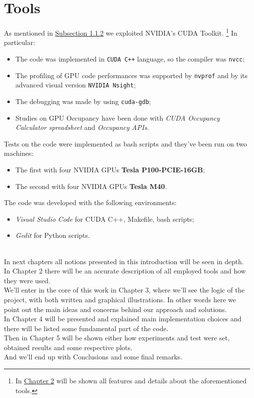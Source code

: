 \section{Tools}
\label{sect:tools}
	As mentioned in \hyperref[subs:otherApps]{Subsection 1.1.2} we exploited NVIDIA's CUDA Toolkit. 
	\footnote{In \hyperref[chap:tools]{Chapter 2} will be shown all features and details about the aforementioned tools.}	
	In particular:
	\begin{itemize}
		\item The code was implemented in \texttt{CUDA C++} language, so the compiler was \texttt{nvcc};	
			
		\item The profiling of GPU code performances was supported by \texttt{nvprof} and by its advanced visual version \texttt{NVIDIA Nsight};
				
		\item The debugging was made by using \texttt{cuda-gdb};
				
		\item Studies on GPU Occupancy have been done with \textit{CUDA Occupancy Calculator spreadsheet} and \textit{Occupancy APIs}.
	\end{itemize}
	Tests on the code were implemented as bash scripts and they've been run on two machines:	
	\begin{itemize}
		\item The first with four NVIDIA GPUs \textbf{Tesla P100-PCIE-16GB};
		
		\item The second with four NVIDIA GPUs \textbf{Tesla M40}.
	\end{itemize}
	The code was developed with the following environments:
	\begin{itemize}
		\item \textit{Visual Studio Code} for CUDA C++, Makefile, bash scripts;
		\item \textit{Gedit} for Python scripts.\\\\
	\end{itemize}
		
In next chapters all notions presented in this introduction will be seen in depth.\\
In Chapter 2 there will be an accurate description of all employed tools and how they were used.\\
We'll enter in the core of this work in Chapter 3, where we'll see the logic of the project, with both written and graphical illustrations. In other words here we point out the main ideas and concerns behind our approach and solutions.\\
In Chapter 4 will be presented and explained main implementation choices and there will be listed some fundamental part of the code.\\ 
Then in Chapter 5 will be shown either how experiments and test were set, obtained results and some respective plots.\\
And we'll end up with Conclusions and some final remarks. 
